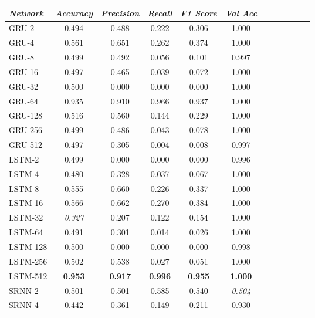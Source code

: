 \begin{table}[t]
\begin{tabularx}{\textwidth}{@{}l*{10}{C}c@{}}
\toprule
  \textit{Network} &  \textit{Accuracy} &  \textit{Precision} &  \textit{Recall} &  \textit{F1 Score} &  \textit{Val Acc} \\
\midrule
    GRU-2 &     0.494 &      0.488 &   0.222 &     0.306 &    1.000 \\
    GRU-4 &     0.561 &      0.651 &   0.262 &     0.374 &    1.000 \\
    GRU-8 &     0.499 &      0.492 &   0.056 &     0.101 &    0.997 \\
   GRU-16 &     0.497 &      0.465 &   0.039 &     0.072 &    1.000 \\
   GRU-32 &     0.500 &      0.000 &   0.000 &     0.000 &    1.000 \\
   GRU-64 &     0.935 &      0.910 &   0.966 &     0.937 &    1.000 \\
  GRU-128 &     0.516 &      0.560 &   0.144 &     0.229 &    1.000 \\
  GRU-256 &     0.499 &      0.486 &   0.043 &     0.078 &    1.000 \\
  GRU-512 &     0.497 &      0.305 &   0.004 &     0.008 &    0.997 \\
   LSTM-2 &     0.499 &      0.000 &   0.000 &     0.000 &    0.996 \\
   LSTM-4 &     0.480 &      0.328 &   0.037 &     0.067 &    1.000 \\
   LSTM-8 &     0.555 &      0.660 &   0.226 &     0.337 &    1.000 \\
  LSTM-16 &     0.566 &      0.662 &   0.270 &     0.384 &    1.000 \\
  LSTM-32 &     \textit{0.327} &      0.207 &   0.122 &     0.154 &    1.000 \\
  LSTM-64 &     0.491 &      0.301 &   0.014 &     0.026 &    1.000 \\
 LSTM-128 &     0.500 &      0.000 &   0.000 &     0.000 &    0.998 \\
 LSTM-256 &     0.502 &      0.538 &   0.027 &     0.051 &    1.000 \\
 LSTM-512 &     \textbf{0.953} &      \textbf{0.917} &   \textbf{0.996} &     \textbf{0.955} &    \textbf{1.000} \\
   SRNN-2 &     0.501 &      0.501 &   0.585 &     0.540 &    \textit{0.504} \\
   SRNN-4 &     0.442 &      0.361 &   0.149 &     0.211 &    0.930 \\

\end{tabularx}
\end{table}
